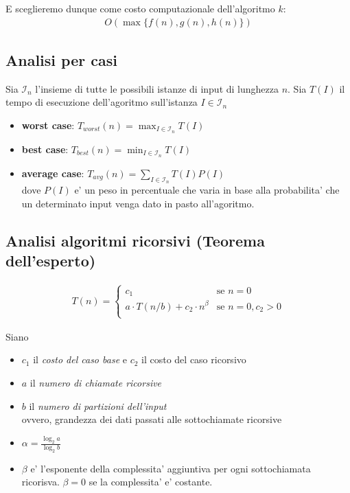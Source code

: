 \documentclass{article}
\begin{document}
E sceglieremo dunque come costo computazionale dell'algoritmo $k$:
\begin{align*}
O(\max{\{f(n), g(n), h(n)\}})
\end{align*}

\subsection{Analisi per casi}

Sia $\mathcal{I}_n$ l'insieme di tutte le possibili istanze di input di lunghezza $n$. Sia
$T(I)$ il tempo di esecuzione dell'agoritmo sull'istanza $I \in \mathcal{I}_n$

\begin{itemize}
  \item \textbf{worst case}: $T_{worst}(n) = \max_{I \in \mathcal{I}_n}{T(I)}$
  \item \textbf{best case}: $T_{best}(n) = \min_{I \in \mathcal{I}_n}{T(I)}$
  \item \textbf{average case}: $T_{avg}(n) = \sum_{I \in \mathcal{I}_n}{T(I)P(I)}$ \\
    dove $P(I)$ e' un peso in percentuale che varia in base alla probabilita'
    che un determinato input venga dato in pasto all'agoritmo.
\end{itemize}

\subsection{Analisi algoritmi ricorsivi (Teorema dell'esperto)}

\begin{align*}
  T(n) = \begin{cases}
    c_1 &\text{se } n = 0 \\
    a \cdot T(n/b) + c_2 \cdot n^{\beta} &\text{se } n = 0, c_2 > 0 \\
  \end{cases}
\end{align*}

Siano
\begin{itemize}
  \item $c_1$ il \emph{costo del caso base} e $c_2$ il costo del caso ricorsivo
  \item $a$ il \emph{numero di chiamate ricorsive}
  \item $b$ il \emph{numero di partizioni dell'input} \\
    ovvero, grandezza dei dati passati alle sottochiamate ricorsive
  \item $\alpha = \frac{\log_2 a }{\log_2 b }$
  \item $\beta$ e' l'esponente della complessita' aggiuntiva per ogni
    sottochiamata ricorisva. $\beta = 0$ se la complessita' e' costante.
\end{itemize}
\end{document}
